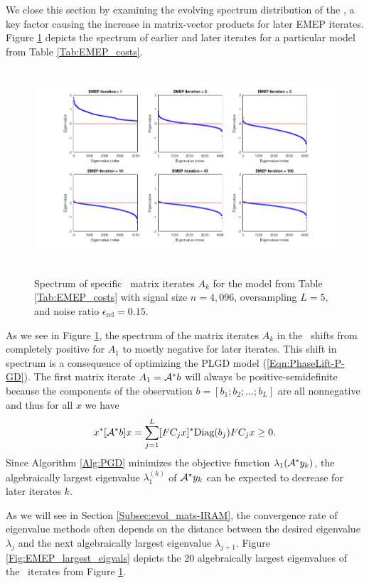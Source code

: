We close this section by examining the evolving spectrum distribution of the \emep, a key factor causing the increase in matrix-vector products for later EMEP iterates.
Figure \ref{Fig:EMEP_full_spectrum} depicts the spectrum of earlier and later iterates for a particular model from Table \ref{Tab:EMEP_costs}.



\begin{figure}[H]
\centering
\hbox{\hspace{-1.9cm} \includegraphics[scale=0.6]{EMEP_full_spectrum} }\vspace{-0.4cm}
	\caption{Spectrum of specific \emep \ matrix iterates $A_k$ for the model from Table \ref{Tab:EMEP_costs} with signal size $n = 4,096$, oversampling $L = 5$, and noise ratio $\epsilon_\text{rel} = 0.15$.}
\label{Fig:EMEP_full_spectrum}
\end{figure}

As we see in Figure \ref{Fig:EMEP_full_spectrum}, the spectrum of the matrix iterates $A_k$ in the \emep \ shifts from completely positive for $A_1$ to mostly negative for later iterates.  This shift in spectrum is a consequence of optimizing the PLGD model (\ref{Eqn:PhaseLift-P-GD}).  The first matrix iterate $A_1 = {\mathcal A}^*b$ will always be positive-semidefinite because the components of the observation $b=[b_1; b_2; \ldots; b_L]$ are all nonnegative and thus for all $x$ we have 
\[
x^*[{\mathcal A}^*b]x 
	= \sum\limits_{\substack{j=1}}^{\substack{L}}
		[FC_jx]^* \textnormal{Diag}(b_j) F C_jx
	\geq 0.
\]
Since Algorithm \ref{Alg:PGD} minimizes the objective function $\lambda_1({\mathcal A}^*y_k)$, the algebraically largest eigenvalue $\lambda_1^{(k)}$ of ${\mathcal A}^*y_k$ can be expected to decrease for later iterates $k$.  


As we will see in Section \ref{Subsec:evol_mats-IRAM}, the convergence rate of eigenvalue methods often depends on the distance between the desired eigenvalue $\lambda_j$ and the next algebraically largest eigenvalue $\lambda_{j+1}$.  Figure \ref{Fig:EMEP_largest_eigvals} depicts the 20 algebraically largest eigenvalues of the \emep \ iterates from Figure \ref{Fig:EMEP_full_spectrum}.



